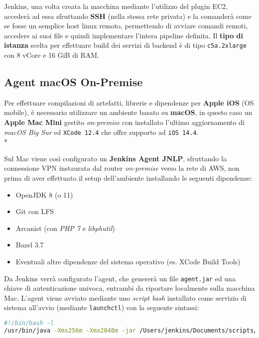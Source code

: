 \documentclass[../main.tex]{subfiles}
\begin{document}
        	    Jenkins, una volta creata la macchina mediante l'utilizzo del plugin EC2, accederà ad essa sfruttando \textbf{SSH} (nella stessa rete privata) e la comanderà come se fosse un semplice host linux remoto, permettendo di avviare comandi remoti, accedere ai suoi file e quindi implementare l'intera pipeline definita. Il \textbf{tipo di istanza} scelta per effettuare build dei servizi di backend è di tipo \verb|c5a.2xlarge| con 8 vCore e 16 GiB di RAM.
        	
        	\subsection{Agent macOS On-Premise}
    	
    	        Per effettuare compilazioni di artefatti, librerie e dipendenze per \textbf{Apple iOS} (OS mobile), è necessario utilizzare un ambiente basato su \textbf{macOS}, in questo caso un \textbf{Apple Mac Mini} gestito \emph{on-premise} con installato l'ultimo aggiornamento di \emph{macOS Big Sur} ed \verb|XCode 12.4| che offre supporto ad \verb|iOS 14.4|.\\*
    	        
    	        Sul Mac viene così configurato un \textbf{Jenkins Agent JNLP}, sfruttando la connessione VPN instaurata dal router \emph{on-premise} verso la rete di AWS, non prima di aver effettuato il setup dell'ambiente installando le seguenti dipendenze:
    	        \begin{itemize}
    	            \item OpenJDK 8 (o 11)
    	            \item Git con LFS
    	            \item Arcanist (con \emph{PHP 7} e \emph{libphutil})
    	            \item Bazel 3.7
    	            \item Eventuali altre dipendenze del sistema operativo (es. XCode Build Tools)
    	        \end{itemize}
    	        
    	        Da Jenkins verrà configurato l'agent, che genererà un file \verb|agent.jar| ed una chiave di autenticazione univoca, entrambi da riportare localmente sulla macchina Mac. L'agent viene avviato mediante uno \emph{script bash} installato come servizio di sistema all'avvio (mediante \verb|launchctl|) con la seguente sintassi:
    	        \begin{lstlisting}[language=bash]
#!/bin/bash -l
/usr/bin/java -Xms256m -Xmx2048m -jar /Users/jenkins/Documents/scripts/agent.jar -jnlpUrl "https://jenkins.domain.com/computer/macos/slave-agent.jnlp" -secret "<secret>" -workDir "/Users/jenkins/build/"
    	        \end{lstlisting}
    	
\end{document}

